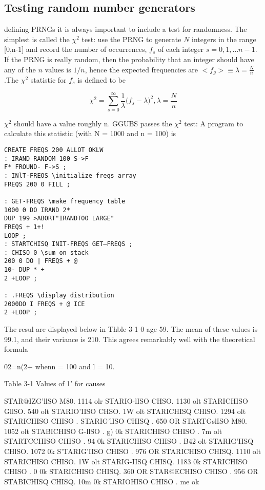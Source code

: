 
\subsection{Testing random number generators}
 defining PRNGs it is always important to include a test
for randomness. The simplest is called the $\chi^2$ test: use the
PRNG to generate $N$ integers in the range [0,n-1] and record
the number of occurrences, $f_s$ of each integer $s = 0, 1, \dots n-1$. If
the PRNG is really random, then the probability that an integer
should have any of the $n$ values is $1/n$, hence the expected 
frequencies are $<f_g> \equiv \lambda = \frac{N}{n}$ .The $\chi^2$ statistic for $f_s$ is defined to
be

\begin{equation}
\chi^2=\sum_{s=0}^{\infty}\frac{1}{\lambda}\Big(f_s-\lambda\Big)^2, \lambda=\frac{N}{n} %
\end{equation}


$\chi^2$ should have a value roughly n. GGUBS passes the $\chi^2$ test: A
program to calculate this statistic (with N = 1000 and n = 100) is

\begin{verbatim}
CREATE FREQS 200 ALLOT OKLW
: IRAND RANDOM 100 S->F
F* FROUND- F->S ;
: INlT-FREOS \initialize freqs array
FREQS 200 0 FILL ;

: GET-FREQS \make frequency table
1000 0 DO IRAND 2*
DUP 199 >ABORT"IRANDTOO LARGE"
FREQS + 1+!
LOOP ;
: STARTCHISQ INIT-FREQS GET—FREQS ;
: CHISO 0 \sum on stack
200 0 DO | FREQS + @
10- DUP * +
2 +LOOP ;

: .FREQS \display distribution
2000DO I FREQS + @ ICE
2 +LOOP ;

\end{verbatim}
 


The resul are displayed below in Thble 3-1 0 age 59. The mean
of these values is 99.1, and their variance is 210. This agrees
remarkably well with the theoretical formula

02=n(2+%
whenn = 100 and l = 10.

Table 3-1 Values of 1' for causes

 

STAR@IZG'llSO M80. 1114 olr STARIO-lISO CHSO. 1130 olt
STARICHISO GllSO. 540 olt STARIO'IISO CHSO. 1W olt
STARICHISQ CHlSO. 1294 olt STARICHISO CHISO . %
STARIG'lISO CHISQ . 650 OR STARTGslISO M80. 1052 olt
STABICHISO G-llSO . g) 0k STARICHISO CHISO . 7m olt
STARTCCHISO CHISO . 94 0k STARICHISO CHISO . B42 olt
STARIG'IISQ CHlSO. 1072 0k S'TARIG'IISO CHISO . 976 OR
STARICHISO CHISQ. 1110 olt STARICHISO CHISO. 1W olt
STARIG-IISQ CHISQ. 1183 0k STARICHISO CHISO . $0$ 0k
STARICHISO CHISQ. 360 OR STAR@ECHISO CHISO . 956 OR
STABICHISQ CHISQ. 10m 0k STARIOHISO CHISO . me ok

